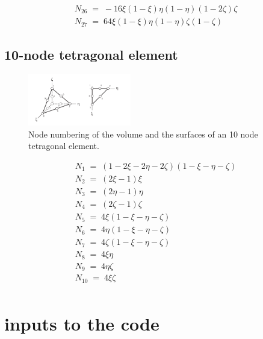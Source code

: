 \documentclass{article}
\begin{document}
\begin{eqnarray}   
	N_{26} \;=\; -16\xi(1-\xi)\eta(1-\eta)(1-2\zeta)\zeta \\
	N_{27} \;=\; 64\xi(1-\xi)\eta(1-\eta)\zeta(1-\zeta)
 \end{eqnarray}


\subsection{10-node tetragonal element}

\begin{figure}[ht!]
    \centering
            \includegraphics[width=0.4\textwidth]{10nodetet.pdf}
    \caption{Node numbering of the volume and the surfaces of an 10 node tetragonal element.}
    \label{fig4}
\end{figure}

\begin{eqnarray}
   N_{1} \;=\;(1-2\xi-2\eta-2\zeta)(1-\xi-\eta-\zeta) \\
   N_{2} \;=\;(2\xi-1)\xi \\
   N_{3} \;=\;(2\eta-1)\eta \\
   N_{4} \;=\;(2\zeta-1)\zeta \\
   N_{5} \;=\;4\xi(1-\xi-\eta-\zeta) \\
   N_{6} \;=\;4\eta(1-\xi-\eta-\zeta) \\
   N_{7} \;=\;4\zeta(1-\xi-\eta-\zeta) \\
   N_{8} \;=\;4\xi\eta \\
   N_{9} \;=\;4\eta\zeta \\
   N_{10} \;=\;4\xi\zeta \\
\end{eqnarray}



\section{inputs to the code}
\end{document}
